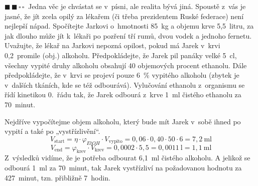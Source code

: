 \documentclass{book}
\newcommand{\dva}{$\blacksquare \, \blacksquare \, \square \, \square \; \; $}
\renewenvironment{quotation}{\par}{\par} %
\begin{document}
\begin{quotation}
\dva Jedna věc je chvástat se v~písni, ale realita bývá jiná. Spoustě z~vás
je jasné, že jít zcela opilý za lékařem (či třeba prezidentem Ruské
federace) není nejlepší nápad. Spočítejte Jarkovi o~hmotnosti 85~kg
a objemu krve 5,5~litru, za jak dlouho může jít k~lékaři po pozření
tří rumů, dvou vodek a jednoho fernetu. Uvažujte, že lékař na Jarkovi
nepozná opilost, pokud má Jarek v~krvi 0,2~promile (obj.) alkoholu.
Předpokládejte, že Jarek pil panáky velké 5~cl, všechny vypité druhy
alkoholu obsahují 40 objemových procent ethanolu. Dále předpokládejte,
že v~krvi se projeví pouze 6~\% vypitého alkoholu (zbytek je v~dalších
tkáních, kde se též odbourává). Vylučování ethanolu z~organismu se řídí kinetikou 0.~řádu
tak, že Jarek odbourá z~krve 1~ml čistého ethanolu za 70~minut.
\end{quotation} \dotfill \par 
\newpage %
Nejdříve vypočítejme objem alkoholu, který bude mít Jarek v~sobě ihned
po vypití a také po „vystřízlivění“. 
\[
V_{\mathrm{start}}=\eta\cdot\varphi_{EtOH}\cdot V_{\mathrm{vypito}}=0,06\cdot0,40\cdot50\cdot6=7,2\ \mathrm{ml}
\]
\[
V_{\mathrm{end}}=\varphi_{\mathrm{krev}}\cdot V_{\mathrm{krev}}=0,0002\cdot5,5=0,0011\ \mathrm{l}=1,1\ \mathrm{ml}
\]
Z~výsledků vidíme, že je potřeba odbourat 6,1~ml čistého alkoholu.
A jelikož se odbourá 1~ml za 70~minut, tak Jarek vystřízliví na požadovanou
hodnotu za 427~minut, tzn. přibližně 7~hodin. 
\end{document}
